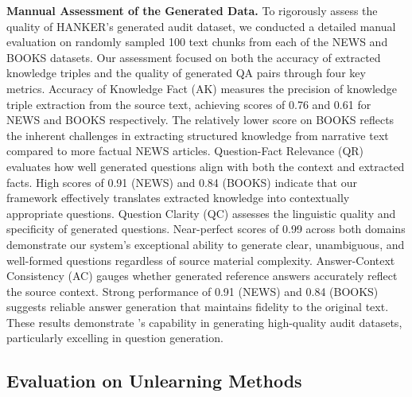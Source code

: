 


\noindent\textbf{Mannual Assessment of the Generated Data.}
To rigorously assess the quality of HANKER's generated audit dataset, we conducted a detailed manual evaluation on randomly sampled 100 text chunks from each of the NEWS and BOOKS datasets. Our assessment focused on both the accuracy of extracted knowledge triples and the quality of generated QA pairs through four key metrics.
Accuracy of Knowledge Fact (AK) measures the precision of knowledge triple extraction from the source text, achieving scores of 0.76 and 0.61 for NEWS and BOOKS respectively. The relatively lower score on BOOKS reflects the inherent challenges in extracting structured knowledge from narrative text compared to more factual NEWS articles.
Question-Fact Relevance (QR) evaluates how well generated questions align with both the context and extracted facts. High scores of 0.91 (NEWS) and 0.84 (BOOKS) indicate that our framework effectively translates extracted knowledge into contextually appropriate questions.
Question Clarity (QC) assesses the linguistic quality and specificity of generated questions. Near-perfect scores of 0.99 across both domains demonstrate our system's exceptional ability to generate clear, unambiguous, and well-formed questions regardless of source material complexity.
Answer-Context Consistency (AC) gauges whether generated reference answers accurately reflect the source context. Strong performance of 0.91 (NEWS) and 0.84 (BOOKS) suggests reliable answer generation that maintains fidelity to the original text.
These results demonstrate \sys's capability in generating high-quality audit datasets, particularly excelling in question generation.





\subsection{Evaluation on Unlearning Methods}




